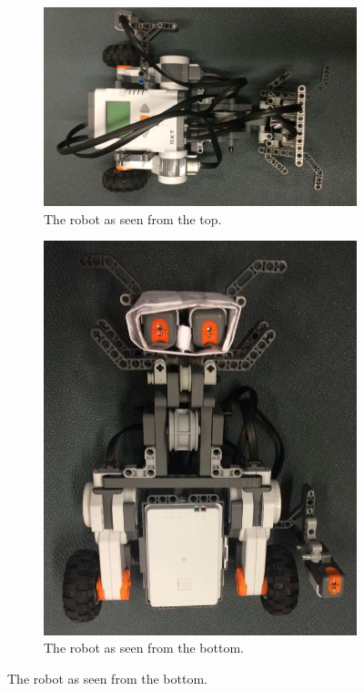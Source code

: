 \begin{figure}[H]
	\begin{subfigure}[b]{0.49\textwidth}
		\includegraphics[angle=90, width=\linewidth]{images/robot_top}	
		\caption{The robot as seen from the top.}
		\label{fig:robottop}
	\end{subfigure}
	\begin{subfigure}[b]{0.49\textwidth}
		\includegraphics[width=\linewidth]{images/robot_bottom}
		\caption{The robot as seen from the bottom.}
		\label{fig:robotbottom}
	\end{subfigure}	
\end{figure}

